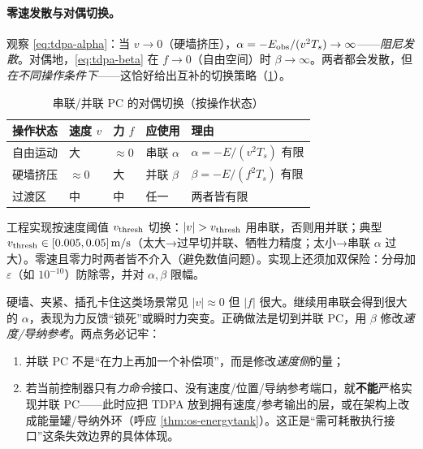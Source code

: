 \paragraph{零速发散与对偶切换。}
观察 \cref{eq:tdpa-alpha}：当 $v\to0$（硬墙挤压），$\alpha=-E_{\rm obs}/(v^2T_s)\to\infty$——\emph{阻尼发散}。对偶地，\cref{eq:tdpa-beta} 在 $f\to0$（自由空间）时 $\beta\to\infty$。两者都会发散，但\emph{在不同操作条件下}——这恰好给出互补的切换策略（\cref{tab:tdpa-switch}）。

\begin{table}[H]\centering\small
\caption{串联/并联 PC 的对偶切换（按操作状态）}
\label{tab:tdpa-switch}
\begin{tabular}{p{} p{} p{} p{} p{}}
\toprule
操作状态 & 速度 $v$ & 力 $f$ & 应使用 & 理由 \\
\midrule
自由运动 & 大 & $\approx0$ & 串联 $\alpha$ & $\alpha=-E/(v^2T_s)$ 有限 \\
硬墙挤压 & $\approx0$ & 大 & 并联 $\beta$ & $\beta=-E/(f^2T_s)$ 有限 \\
过渡区 & 中 & 中 & 任一 & 两者皆有限 \\
\bottomrule
\end{tabular}
\end{table}

工程实现按速度阈值 $v_{\rm thresh}$ 切换：$|v|>v_{\rm thresh}$ 用串联，否则用并联；典型 $v_{\rm thresh}\in[0.005,0.05]\,\mathrm{m/s}$（太大→过早切并联、牺牲力精度；太小→串联 $\alpha$ 过大）。零速且零力时两者皆不介入（避免数值问题）。实现上还须加双保险：分母加 $\varepsilon$（如 $10^{-10}$）防除零，并对 $\alpha,\beta$ 限幅。

\begin{pitfall}[低速大力硬接触：别硬用串联，且并联!=在力上加补偿]
硬墙、夹紧、插孔卡住这类场景常见 $|v|\approx0$ 但 $|f|$ 很大。继续用串联会得到很大的 $\alpha$，表现为力反馈“锁死”或瞬时力突变。正确做法是切到并联 PC，用 $\beta$ 修改\emph{速度/导纳参考}。两点务必记牢：
\begin{enumerate}
  \item 并联 PC 不是“在力上再加一个补偿项”，而是修改\emph{速度侧}的量；
  \item 若当前控制器只有\emph{力命令}接口、没有速度/位置/导纳参考端口，就\textbf{不能}严格实现并联 PC——此时应把 TDPA 放到拥有速度/参考输出的层，或在架构上改成能量罐/导纳外环（呼应 \cref{thm:os-energytank}）。这正是“需可耗散执行接口”这条失效边界的具体体现。
\end{enumerate}
\end{pitfall}


